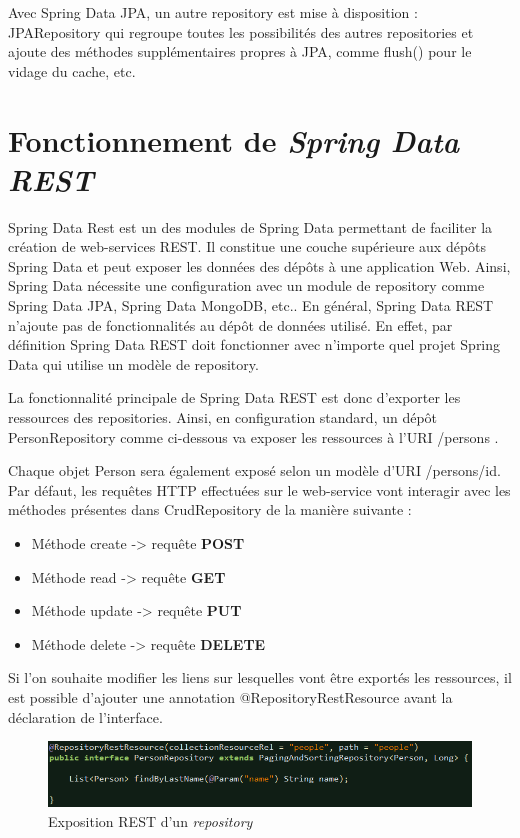 \documentclass{polytech/polytech}
\begin{document}
Avec Spring Data JPA, un autre repository est mise à disposition : JPARepository qui regroupe toutes les possibilités des autres repositories et ajoute des méthodes supplémentaires propres à JPA, comme flush() pour le vidage du cache, etc.

\section{Fonctionnement de \textit{Spring Data REST}}

Spring Data Rest est un des modules de Spring Data permettant de faciliter la création de web-services REST. Il constitue une couche supérieure aux dépôts Spring Data et peut exposer les données des dépôts à une application Web. Ainsi, Spring Data nécessite une configuration avec un module de repository comme Spring Data JPA, Spring Data MongoDB, etc.. En général, Spring Data REST n’ajoute pas de fonctionnalités au dépôt de données utilisé. En effet, par définition Spring Data REST doit fonctionner avec n’importe quel projet Spring Data qui utilise un modèle de repository.

La fonctionnalité principale de Spring Data REST est donc d’exporter les ressources des repositories. Ainsi, en configuration standard, un dépôt PersonRepository comme ci-dessous va exposer les ressources à l’URI /persons .


Chaque objet Person sera également exposé selon un modèle d’URI /persons/{id}. Par défaut, les requêtes HTTP effectuées sur le web-service vont interagir avec les méthodes présentes dans CrudRepository de la manière suivante : 

\begin{itemize}
	\item Méthode create -> requête \textbf{POST}
	\item Méthode read -> requête \textbf{GET}
	\item Méthode update -> requête \textbf{PUT}
	\item Méthode delete -> requête \textbf{DELETE}
\end{itemize}

Si l’on souhaite modifier les liens sur lesquelles vont être exportés les ressources, il est possible d’ajouter une annotation @RepositoryRestResource avant la déclaration de l’interface.

\begin{figure}
	\includegraphics[scale=0.85]{images/repositoryRESTResource}
	\caption{Exposition REST d'un \textit{repository}}
	\label{fig:repositoryRESTResource}
\end{figure}
\end{document}
